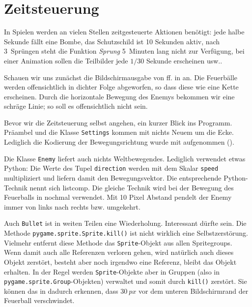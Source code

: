 \section{Zeitsteuerung}
In Spielen werden an vielen Stellen zeitgesteuerte Aktionen benötigt: jede halbe Sekunde fällt eine Bombe, das Schutzschild ist 10 Sekunden aktiv, nach 3~Sprüngen steht die Funktion \emph{Sprung} 5~Minuten lang nicht zur Verfügung, bei einer Animation sollen die Teilbilder jede $1/30$ Sekunde erscheinen usw..

Schauen wir uns zunächst die Bildschirmausgabe von ff. in  an. Die Feuerbälle werden offensichtlich in dichter Folge abgeworfen, so dass diese wie eine Kette erscheinen. Durch die horizontale Bewegung des Enemys bekommen wir eine schräge Linie; so soll es offensichtlich nicht sein. 


Bevor wir die Zeitsteuerung selbst angehen, ein kurzer Blick ins Programm. Präambel und die Klasse \texttt{Settings} kommen mit nichts Neuem um die Ecke. Lediglich die Kodierung der Bewegungsrichtung wurde mit aufgenommen (). 


Die Klasse \texttt{Enemy} liefert auch nichts Weltbewegendes. Lediglich  verwendet etwas Python: Die Werte des Tupel \texttt{direction} werden mit dem Skalar \texttt{speed} multipliziert und liefern damit den Bewegungsvektor. Die entsprechende Python-Technik nennt sich \gls{listcomp}. Die gleiche Technik wird bei der Bewegung des Feuerballs in  nochmal verwendet. Mit 10 Pixel Abstand pendelt der Enemy immer von links nach rechts bzw. umgekehrt.


Auch \texttt{Bullet} ist in weiten Teilen eine Wiederholung. Interessant dürfte  sein. Die Methode \texttt{pygame.sprite.Sprite.kill()} ist nicht wirklich eine Selbstzerstörung. Vielmehr entfernt diese Methode das \texttt{Sprite}-Objekt aus allen Spritegroups. Wenn damit auch alle Referenzen verloren gehen, wird natürlich auch dieses Objekt zerstört, besteht aber noch irgendwo eine Referenz, bleibt das Objekt erhalten. In der Regel werden \texttt{Sprite}-Objekte aber in Gruppen (also in \texttt{pygame.sprite.Group}-Objekten) verwaltet und somit durch \texttt{kill()} zerstört. Sie können das in  dadurch erkennen, dass $30~px$ vor dem unteren Bildschirmrand der Feuerball verschwindet.

